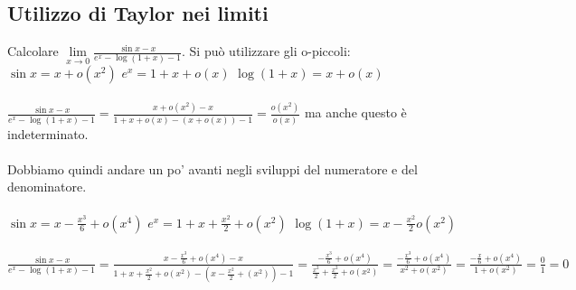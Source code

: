 \subsection{Utilizzo di Taylor nei limiti}
\begin{example}
Calcolare $\lim\limits_{x\to 0}\frac{\sin{x} - x}{e^x - \log(1 + x) - 1}$. Si può utilizzare gli o-piccoli:\\
$\sin{x} = x + o(x^2)$ \hspace{.5cm} $e^x = 1 + x + o(x)$ \hspace{.5cm} $\log(1 + x) = x + o(x)$\\\\
$\frac{\sin{x} - x}{e^x - \log(1 + x) - 1} = \frac{x + o(x^2) - x}{1 + x + o(x) - (x + o(x)) - 1} = \frac{o(x^2)}{o(x)}$ ma anche questo è indeterminato.\\\\
Dobbiamo quindi andare un po' avanti negli sviluppi del numeratore e del denominatore.\\\\
$\sin{x} = x - \frac{x^3}{6} + o(x^4)$ \hspace{.5cm} $e^x = 1 + x + \frac{x^2}{2} + o(x^2)$ \hspace{.5cm} $\log(1 + x) = x -\frac{x^2}{2} o(x^2)$\\\\
$\frac{\sin{x} - x}{e^x - \log(1 + x) - 1} = \frac{x - \frac{x^3}{6} + o(x^4) - x}{1 + x + \frac{x^2}{2} + o(x^2) - (x - \frac{x^2}{2} + (x^2)) - 1} = \frac{-\frac{x^3}{6} + o(x^4)}{\frac{x^2}{2} + \frac{x^2}{2} + o(x^2)} = \frac{-\frac{x^3}{6} + o(x^4)}{x^2 + o(x^2)} = \frac{-\frac{x}{6} + o(x^4)}{1 + o(x^2)} = \frac{0}{1} = 0$
\end{example}

